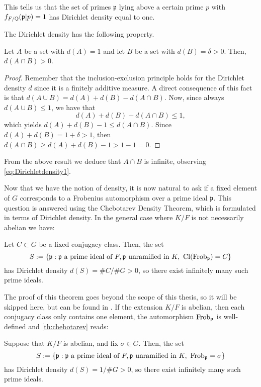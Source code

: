 \documentclass[../main.tex]{subfiles}
\begin{document}
\begin{remark}\label{remark:inertia1density1}
	This tells us that the set of primes $\mathfrak{p}$ lying above a certain prime $p$ with $f_{F/\mathbb{Q}}(\mathfrak{p}|p)=1$ has Dirichlet density equal to one.
\end{remark}
The Dirichlet density has the following property.
\begin{lemma}\label{lemma:densityint}
	Let $A$ be a set with $d(A)=1$ and let $B$ be a set with $d(B)=\delta>0$. Then, $d(A\cap B)>0$.
\end{lemma}
\begin{proof}
	Remember that the inclusion-exclusion principle holds for the Dirichlet density $d$ since it is a finitely additive measure. A direct consequence of this fact is that $d(A\cup B)=d(A)+d(B)-d(A\cap B)$. Now, since always $d(A\cup B)\leqslant 1$, we have that
	\begin{equation*}
		d(A)+d(B)-d(A\cap B)\leqslant 1,
	\end{equation*}
	which yields $d(A)+d(B)-1\leqslant d(A\cap B)$. Since $d(A)+d(B)=1+\delta>1$, then $d(A\cap B)\geqslant d(A)+d(B)-1 > 1-1=0$. 
\end{proof}

\begin{remark}\label{remark:intinfinite}
	From the above result we deduce that $A\cap B$ is infinite, observing \cref{eq:Dirichletdensity1}.
\end{remark}

Now that we have the notion of density, it is now natural to ask if a fixed element of $G$ corresponds to a Frobenius automorphism over a prime ideal $\mathfrak{p}$. This question is answered using the Chebotarev Density Theorem, which is formulated in terms of Dirichlet density. In the general case where $K/F$ is not necessarily abelian we have:
\begin{theorem}\label{th:chebotarev}
	Let $C\subset G$ be a fixed conjugacy class. Then, the set 
	\begin{equation*}
		S:=\{\mathfrak{p}: \mathfrak{p} \ \text{a prime ideal of} \ F, \mathfrak{p} \ \text{unramified in} K, \ \Cl(\Frob_\mathfrak{p})=C\}
	\end{equation*}
	has Dirichlet density $d(S)=\# C/\# G>0$, so there exist infinitely many such prime ideals.
\end{theorem}

The proof of this theorem goes beyond the scope of this thesis, so it will be skipped here, but can be found in \cite{Chebotarev1}. If the extension $K/F$ is abelian, then each conjugacy class only contains one element, the automorphism $\operatorname{Frob}_{\mathfrak{p}}$ is well-defined and \cref{th:chebotarev} reads:

\begin{corollary}\label{corol:abelchebotarev}
	Suppose that $K/F$ is abelian, and fix $\sigma\in G$. Then, the set 
	\begin{equation*}
		S:=\{\mathfrak{p}: \mathfrak{p} \ \text{a prime ideal of} \ F, \mathfrak{p} \ \text{unramified in} K, \ \Frob_\mathfrak{p} = \sigma\}
	\end{equation*}
	has Dirichlet density $d(S)=1/\# G>0$, so there exist infinitely many such prime ideals.
\end{corollary}
\end{document}
